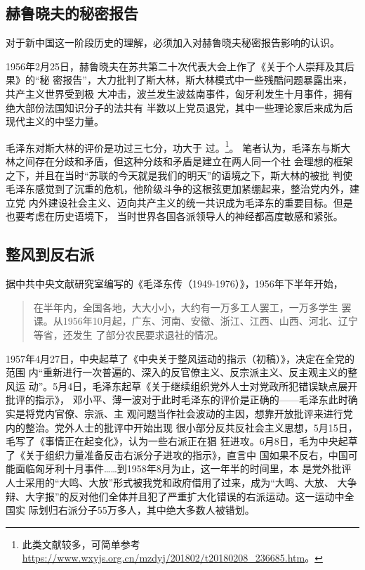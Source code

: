 \subsection{赫鲁晓夫的秘密报告}

对于新中国这一阶段历史的理解，必须加入对赫鲁晓夫秘密报告影响的认识。

1956年2月25日，赫鲁晓夫在苏共第二十次代表大会上作了《关于个人崇拜及其后果》的``秘
密报告''，大力批判了斯大林，斯大林模式中一些残酷问题暴露出来，共产主义世界受到极
大冲击，波兰发生波兹南事件，匈牙利发生十月事件，拥有绝大部份法国知识分子的法共有
半数以上党员退党，其中一些理论家后来成为后现代主义的中坚力量。

毛泽东对斯大林的评价是功过三七分，功大于
过。\footnote{此类文献较多，可简单参考\url{https://www.wxyjs.org.cn/mzdyj/201802/t20180208_236685.htm}。}。
笔者认为，毛泽东与斯大林之间存在分歧和矛盾，但这种分歧和矛盾是建立在两人同一个社
会理想的框架之下，并且在当时``苏联的今天就是我们的明天''的语境之下，斯大林的被批
判使毛泽东感觉到了沉重的危机，他阶级斗争的这根弦更加紧绷起来，整治党内外，建立党
内外建设社会主义、迈向共产主义的统一共识成为毛泽东的重要目标。但是也要考虑在历史语境下，
当时世界各国各派领导人的神经都高度敏感和紧张。

\subsection{整风到反右派}

据中共中央文献研究室编写的《毛泽东传（1949-1976）》，1956年下半年开始，
\begin{quotation}在半年内，全国各地，大大小小，大约有一万多工人罢工，一万多学生
  罢课。从1956年10月起，广东、河南、安徽、浙江、江西、山西、河北、辽宁等省，还发生
  了部分农民要求退社的情况。
\end{quotation}

1957年4月27日，中央起草了《中央关于整风运动的指示（初稿）》，决定在全党的范围
内``重新进行一次普遍的、深入的反官僚主义、反宗派主义、反主观主义的整风运
动''。5月4日，毛泽东起草《关于继续组织党外人士对党政所犯错误缺点展开批评的指示》，
邓小平、薄一波对于此时毛泽东的评价是正确的——毛泽东此时确实是将党内官僚、宗派、主
观问题当作社会波动的主因，想靠开放批评来进行党内的整治。党外人士的批评中开始出现
很小部分反共反社会主义思想，5月15日，毛写了《事情正在起变化》，认为一些右派正在猖
狂进攻。6月8日，毛为中央起草了《关于组织力量准备反击右派分子进攻的指示》，直言中
国如果不反右，中国可能面临匈牙利十月事件……到1958年8月为止，这一年半的时间里，本
是党外批评人士采用的``大鸣、大放''形式被我党和政府借用了过来，成为``大鸣、大放、
大争辩、大字报''的反对他们全体并且犯了严重扩大化错误的右派运动。这一运动中全国实
际划归右派分子55万多人，其中绝大多数人被错划。


